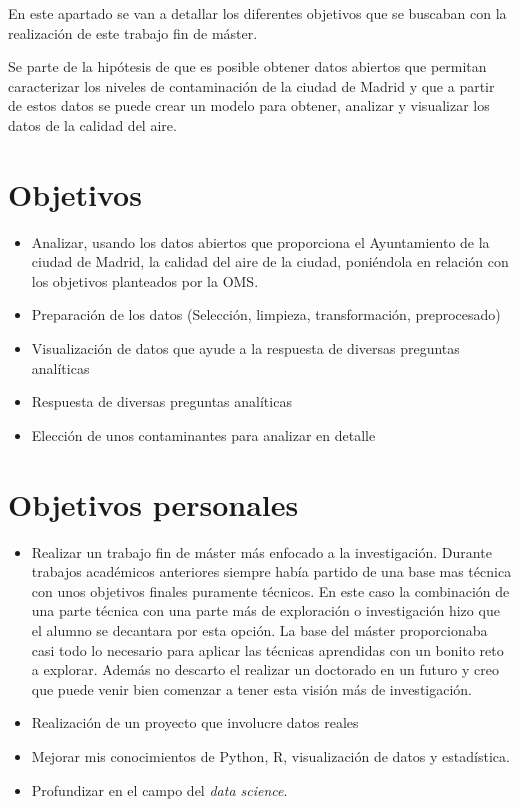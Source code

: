 
En este apartado se van a detallar los diferentes objetivos que se buscaban con la realización de este trabajo fin de máster.

Se parte de la hipótesis de que es posible obtener datos abiertos que permitan caracterizar  los niveles de contaminación de la ciudad de Madrid y que a partir de estos datos se puede crear un modelo para obtener, analizar y visualizar los datos 
de la calidad del aire.

\section{Objetivos}\label{objetivos-generales}

\begin{itemize}
\tightlist
\item Analizar, usando los datos abiertos que proporciona el Ayuntamiento de la ciudad de Madrid, la calidad del aire de la ciudad, poniéndola en relación con los objetivos planteados por la OMS.
\item Preparación de los datos (Selección, limpieza, transformación, preprocesado)
\item Visualización de datos que ayude a la respuesta de diversas preguntas analíticas 
\item Respuesta de diversas preguntas analíticas
\item Elección de unos contaminantes para analizar en detalle
\end{itemize}

\section{Objetivos personales}\label{objetivos-personales}
\begin{itemize}
\tightlist
\item
 Realizar un trabajo fin de máster más enfocado a la investigación. Durante trabajos académicos anteriores siempre había partido de una base mas técnica con unos objetivos finales puramente técnicos. En este caso la combinación de una parte técnica con una parte más de exploración o investigación hizo que el alumno se decantara por esta opción. La base del máster proporcionaba casi todo lo necesario para aplicar las técnicas aprendidas con un bonito reto a explorar. Además no descarto el realizar un doctorado en un futuro y creo que puede venir bien comenzar a tener esta visión más de investigación.
 \item
 Realización de un proyecto que involucre datos reales
\item
  Mejorar mis conocimientos de Python, R, visualización de datos y estadística. 
  \item Profundizar en el campo del \textit{data science}.
\end{itemize}
